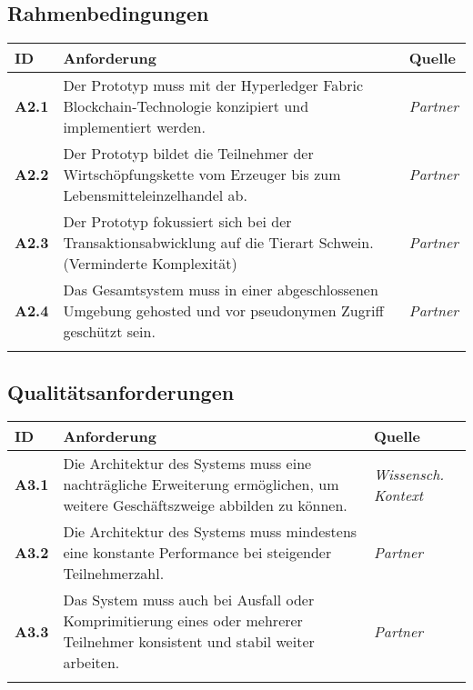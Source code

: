 \subsection{Rahmenbedingungen} \label{tab:functional-requirements}
\begin{table}[H]
    \begin{tabularx}{\textwidth}{@{}lXp{2cm}@{}}
        \toprule
        ID                & Anforderung & Quelle \\
        \midrule
        \textbf{A2.1}              & Der Prototyp muss mit der Hyperledger Fabric Blockchain-Technologie konzipiert und implementiert werden.                     & \textit{Partner}                \\ \addlinespace
        \textbf{A2.2}              & Der Prototyp bildet die Teilnehmer der Wirtschöpfungskette vom Erzeuger bis zum Lebensmitteleinzelhandel ab.                     & \textit{Partner}                \\ \addlinespace
        \textbf{A2.3}              & Der Prototyp fokussiert sich bei der Transaktionsabwicklung auf die Tierart Schwein. (Verminderte Komplexität)                     & \textit{Partner}                \\ \addlinespace
        \textbf{A2.4}\label{req:A2.4}              & Das Gesamtsystem muss in einer abgeschlossenen Umgebung gehosted und vor pseudonymen Zugriff geschützt sein.                     & \textit{Partner}                \\ \addlinespace
        \bottomrule
    \end{tabularx}
\end{table}

\subsection{Qualitätsanforderungen} \label{tab:functional-requirements}
\begin{table}[H]
    \begin{tabularx}{\textwidth}{@{}lXp{2cm}@{}}
        \toprule
        ID                & Anforderung & Quelle \\
        \midrule
        \textbf{A3.1}              & Die Architektur des Systems muss eine nachträgliche Erweiterung ermöglichen, um weitere Geschäftszweige abbilden zu können.                     & \textit{Wissensch. Kontext}                \\ \addlinespace
        \textbf{A3.2}              & Die Architektur des Systems muss mindestens eine konstante Performance bei steigender Teilnehmerzahl.                     & \textit{Partner}                \\ \addlinespace
        \textbf{A3.3}              & Das System muss auch bei Ausfall oder Komprimitierung eines oder mehrerer Teilnehmer konsistent und stabil weiter arbeiten.                    & \textit{Partner}                \\ \addlinespace
        \bottomrule
    \end{tabularx}
\end{table}

